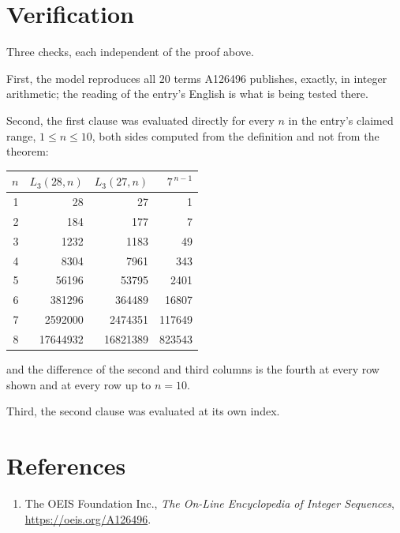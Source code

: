 \documentclass[11pt,a4paper]{article}
\theoremstyle{plain}
\theoremstyle{definition}
\begin{document}
\section{Verification}

Three checks, each independent of the proof above.

First, the model reproduces all $20$ terms A126496 publishes, exactly, in integer
arithmetic; the reading of the entry's English is what is being tested there.

Second, the first clause was evaluated directly for every $n$ in the entry's claimed range,
$1\le n\le10$, both sides computed from the definition and not from the theorem:

\begin{center}
\begin{tabular}{rrrr}
$n$ & $L_{3}(28,n)$ & $L_{3}(27,n)$ & $7^{\,n-1}$ \\ \hline
1 & 28 & 27 & 1 \\
2 & 184 & 177 & 7 \\
3 & 1232 & 1183 & 49 \\
4 & 8304 & 7961 & 343 \\
5 & 56196 & 53795 & 2401 \\
6 & 381296 & 364489 & 16807 \\
7 & 2592000 & 2474351 & 117649 \\
8 & 17644932 & 16821389 & 823543 \\
\end{tabular}
\end{center}

\noindent and the difference of the second and third columns is the fourth at every row shown
and at every row up to $n=10$.

Third, the second clause was evaluated at its own index.

\section*{References}
\begin{enumerate}
\item The OEIS Foundation Inc., \emph{The On-Line Encyclopedia of Integer Sequences},
\url{https://oeis.org/A126496}.
\end{enumerate}
\end{document}
